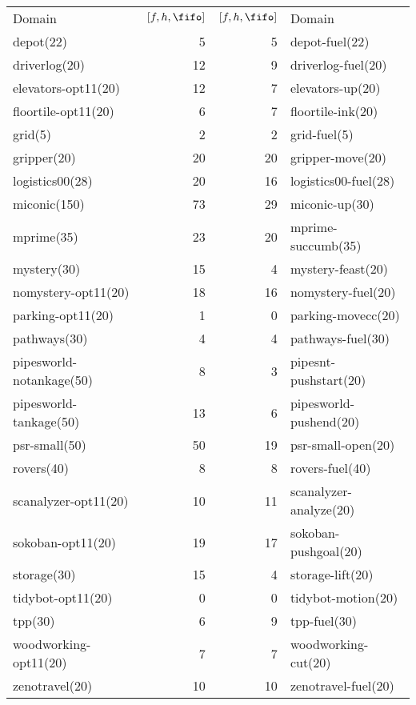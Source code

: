 \begin{center}
\begin{tabular}{lrrl}
Domain & $[f,h,\fifo]$ & $[f,h,\fifo]$ & Domain\\
depot(22) & 5 & 5 & depot-fuel(22)\\
driverlog(20) & 12 & 9 & driverlog-fuel(20)\\
elevators-opt11(20) & 12 & 7 & elevators-up(20)\\
floortile-opt11(20) & 6 & 7 & floortile-ink(20)\\
grid(5) & 2 & 2 & grid-fuel(5)\\
gripper(20) & 20 & 20 & gripper-move(20)\\
logistics00(28) & 20 & 16 & logistics00-fuel(28)\\
miconic(150) & 73 & 29 & miconic-up(30)\\
mprime(35) & 23 & 20 & mprime-succumb(35)\\
mystery(30) & 15 & 4 & mystery-feast(20)\\
nomystery-opt11(20) & 18 & 16 & nomystery-fuel(20)\\
parking-opt11(20) & 1 & 0 & parking-movecc(20)\\
pathways(30) & 4 & 4 & pathways-fuel(30)\\
pipesworld-notankage(50) & 8 & 3 & pipesnt-pushstart(20)\\
pipesworld-tankage(50) & 13 & 6 & pipesworld-pushend(20)\\
psr-small(50) & 50 & 19 & psr-small-open(20)\\
rovers(40) & 8 & 8 & rovers-fuel(40)\\
scanalyzer-opt11(20) & 10 & 11 & scanalyzer-analyze(20)\\
sokoban-opt11(20) & 19 & 17 & sokoban-pushgoal(20)\\
storage(30) & 15 & 4 & storage-lift(20)\\
tidybot-opt11(20) & 0 & 0 & tidybot-motion(20)\\
tpp(30) & 6 & 9 & tpp-fuel(30)\\
woodworking-opt11(20) & 7 & 7 & woodworking-cut(20)\\
zenotravel(20) & 10 & 10 & zenotravel-fuel(20)\\
\end{tabular}
\end{center}
